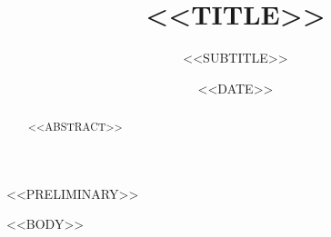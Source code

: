 \documentclass[11pt,a4paper]{article}
\title{<<TITLE>>}
\author{<<SUBTITLE>>}
\date{<<DATE>>}
\begin{document}
\maketitle
\thispagestyle{empty}

\begin{abstract}
<<ABSTRACT>>
\end{abstract}

<<PRELIMINARY>>

\tableofcontents
\listoffigures
\clearpage

<<BODY>>
\end{document}

